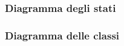 \subsubsection{Diagramma degli stati} \label{sec:design-choices:state-diagram}

\subsubsection{Diagramma delle classi} \label{sec:design-choices:class-diagram}
